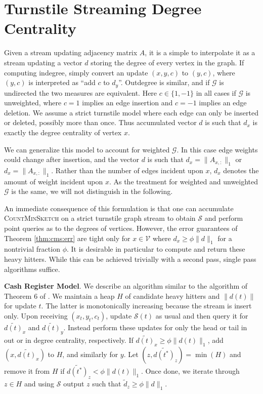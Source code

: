 \documentclass{report}
\newcommand{\algoname}[1]{\textnormal{\textsc{#1}}}
\begin{document}
\section{Turnstile Streaming Degree Centrality} \label{dc:sec:dc}




Given a stream updating adjacency matrix $A$, it is a simple to interpolate it as a stream updating a vector $d$ storing the degree of every vertex in the graph. 
If computing indegree, simply convert an update $(x,y,c)$ to $(y,c)$, where $(y,c)$ is interpreted as ``add $c$ to $d_y$''. 
Outdegree is similar, and if $\mathcal{G}$ is undirected the two measures are equivalent. 
Here $c \in \{1, -1\}$ in all cases if $\mathcal{G}$ is unweighted, where $c=1$ implies an edge insertion and $c=-1$ implies an edge deletion.
We assume a strict turnstile model where each edge can only be inserted or deleted, possibly more than once.
Thus accumulated vector $d$ is such that $d_x$ is exactly the degree centrality of vertex $x$. 

We can generalize this model to account for weighted $\mathcal{G}$.
In this case edge weights could change after insertion, and the vector $d$ is such that $d_x = \|A_{x,:}\|_1$ or $d_x = \|A_{x,:}\|_1$.
Rather than the number of edges incident upon $x$, $d_x$ denotes the amount of weight incident upon $x$. 
As the treatment for weighted and unweighted $\mathcal{G}$ is the same, we will not distinguish in the following. 

An immediate consequence of this formulation is that one can accumulate \algoname{CountMinSketch} on a strict turnstile graph stream to obtain $\mathcal{S}$ and perform point queries as to the degrees of vertices.
However, the error guarantees of Theorem \ref{thm:cms:err} are tight only for $x \in \mathcal{V}$ where $d_x \geq \phi \|d\|_1$ for a nontrivial fraction $\phi$.
It is desirable in particular to compute and return these heavy hitters.
While this can be achieved trivially with a second pass, single pass algorithms suffice.

\textbf{Cash Register Model}.
We describe an algorithm similar to the algorithm of Theorem 6 of \cite{cormode2005improved}.
We maintain a heap $H$ of candidate heavy hitters and $\|d(t)\|$ for update $t$.
The latter is monotonically increasing because the stream is insert only. 
Upon receiving $(x_t, y_t, c_t)$, update $\mathcal{S}(t)$ as usual and then query it for $\widetilde{d(t)}_x$ and $\widetilde{d(t)}_y$.
Instead perform these updates for only the head or tail in out or in degree centrality, respectively.
If $\widetilde{d(t)}_x \geq \phi\|d(t)\|_1$, add $\left ( x, \widetilde{d(t)}_x \right )$ to $H$, and similarly for $y$.
Let $\left ( z, \widetilde{d(t^*)}_z \right ) = \min (H)$ and remove it from $H$ if $\widetilde{d(t^*)}_z < \phi \|d(t)\|_1$.
Once done, we iterate through $z \in H$ and using $\mathcal{S}$ output $z$ such that $\widetilde{d}_z \geq \phi \|d\|_1$.
\end{document}
